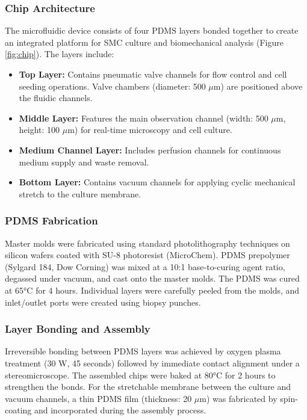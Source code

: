 \documentclass[materials,article,submit,moreauthors,pdftex]{Definitions/mdpi}
\begin{document}
\subsubsection{Chip Architecture}

The microfluidic device consists of four PDMS layers bonded together to create an integrated platform for SMC culture and biomechanical analysis (Figure \ref{fig:chip}). The layers include:

\begin{itemize}
    \item \textbf{Top Layer:} Contains pneumatic valve channels for flow control and cell seeding operations. Valve chambers (diameter: 500 $\mu$m) are positioned above the fluidic channels.
    \item \textbf{Middle Layer:} Features the main observation channel (width: 500 $\mu$m, height: 100 $\mu$m) for real-time microscopy and cell culture.
    \item \textbf{Medium Channel Layer:} Includes perfusion channels for continuous medium supply and waste removal.
    \item \textbf{Bottom Layer:} Contains vacuum channels for applying cyclic mechanical stretch to the culture membrane.
\end{itemize}

\subsubsection{PDMS Fabrication}

Master molds were fabricated using standard photolithography techniques on silicon wafers coated with SU-8 photoresist (MicroChem). PDMS prepolymer (Sylgard 184, Dow Corning) was mixed at a 10:1 base-to-curing agent ratio, degassed under vacuum, and cast onto the master molds. The PDMS was cured at 65°C for 4 hours. Individual layers were carefully peeled from the molds, and inlet/outlet ports were created using biopsy punches.

\subsubsection{Layer Bonding and Assembly}

Irreversible bonding between PDMS layers was achieved by oxygen plasma treatment (30 W, 45 seconds) followed by immediate contact alignment under a stereomicroscope. The assembled chips were baked at 80°C for 2 hours to strengthen the bonds. For the stretchable membrane between the culture and vacuum channels, a thin PDMS film (thickness: 20 $\mu$m) was fabricated by spin-coating and incorporated during the assembly process.
\end{document}
